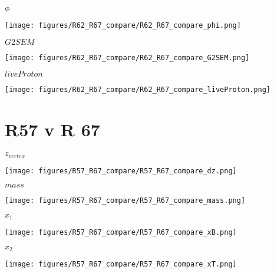 \documentclass{beamer}
\begin{document}
\begin{frame}{$\phi$}
	\begin{center}
		\texttt{[image: figures/R62\_R67\_compare/R62\_R67\_compare\_phi.png]}
	\end{center}
\end{frame}

\begin{frame}{$G2SEM$}
	\begin{center}
		\texttt{[image: figures/R62\_R67\_compare/R62\_R67\_compare\_G2SEM.png]}
	\end{center}
\end{frame}

\begin{frame}{$liveProton$}
	\begin{center}
		\texttt{[image: figures/R62\_R67\_compare/R62\_R67\_compare\_liveProton.png]}
	\end{center}
\end{frame}

\section{R57 v R 67}

\begin{frame}{$z_{vertex}$}
	\begin{center}
		\texttt{[image: figures/R57\_R67\_compare/R57\_R67\_compare\_dz.png]}
	\end{center}
\end{frame}

\begin{frame}{$mass$}
	\begin{center}
		\texttt{[image: figures/R57\_R67\_compare/R57\_R67\_compare\_mass.png]}
	\end{center}
\end{frame}

\begin{frame}{$x_1$}
	\begin{center}
		\texttt{[image: figures/R57\_R67\_compare/R57\_R67\_compare\_xB.png]}
	\end{center}
\end{frame}

\begin{frame}{$x_2$}
	\begin{center}
		\texttt{[image: figures/R57\_R67\_compare/R57\_R67\_compare\_xT.png]}
	\end{center}
\end{frame}
\end{document}
